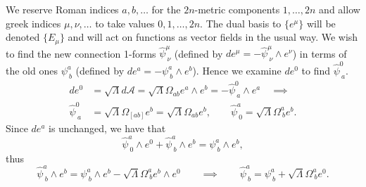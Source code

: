 We reserve Roman indices $a,b,\dots$ for the $2n$-metric components
$1,\dots,2n$ and allow greek indices $\mu,\nu,\dots$ to take values
$0,1,\dots,2n$. The dual basis to $\{e^{\mu}\}$ will be denoted
$\{E_{\mu}\}$ and will act on functions as vector fields in the usual
way. We wish to find the new connection 1-forms $\hat{\psi}_{\ \nu}^{\mu}$
(defined by $ de^{\mu}=-\hat{\psi}_{\ \nu}^{\mu}\wedge e^{\nu}$)
in terms of the old ones $\psi_{\ b}^{a}$ (defined by $ de^{a}=-\psi_{\ b}^{a}\wedge e^{b}$).
Hence we examine ${d}e^{0}$ to find $\hat{\psi}_{\ a}^{0}.$
\begin{align*}
{d}e^{0}&=\sqrt{\Lambda}{d}\mathcal{A}=\sqrt{\Lambda}\Omega_{ab}e^{a}\wedge e^{b}=-\hat{\psi}_{\ a}^{0}\wedge e^{a}\quad\implies \\
\hat{\psi}_{\ a}^{0}&=\sqrt{\Lambda}\Omega_{[ab]}e^{b}=\sqrt{\Lambda}\Omega_{ab}e^{b},\qquad\hat{\psi}_{\ 0}^{a}=\sqrt{\Lambda}\Omega_{\ b}^{a}e^{b}.
\end{align*}
Since ${d}e^{a}$ is unchanged, we have that
\[
\hat{\psi}_{\ 0}^{a}\wedge e^{0}+\hat{\psi}_{\ b}^{a}\wedge e^{b}=\psi_{\ b}^{a}\wedge e^{b},
\]
thus
\[
\hat{\psi}_{\ b}^{a}\wedge e^{b}=\psi_{\ b}^{a}\wedge e^{b}-\sqrt{\Lambda}\Omega_{\ b}^{a}e^{b}\wedge e^{0}\qquad\implies\qquad\hat{\psi}_{\ b}^{a}=\psi_{\ b}^{a}+\sqrt{\Lambda}\Omega_{\ b}^{a}e^{0}.
\]


